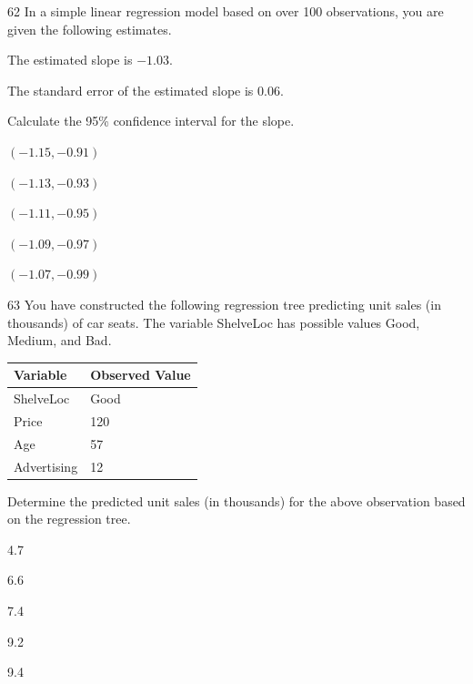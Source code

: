 \begin{question}{62}
In a simple linear regression model based on over 100 observations, you are given the following estimates.
\begin{given}
\item The estimated slope is $-1.03$.
\item The standard error of the estimated slope is 0.06.
\end{given}

Calculate the 95\% confidence interval for the slope.

\begin{choices}
\item $(-1.15, -0.91)$
\item $(-1.13, -0.93)$
\item $(-1.11, -0.95)$
\item $(-1.09, -0.97)$
\item $(-1.07, -0.99)$
\end{choices}
\end{question}

\begin{question}{63}
You have constructed the following regression tree predicting unit sales (in thousands) of car seats. The variable ShelveLoc has possible values Good, Medium, and Bad.


\begin{center}
\begin{tabular}{|l|l|}
\hline
\textbf{Variable} & \textbf{Observed Value} \\ \hline
ShelveLoc & Good \\ \hline
Price & 120 \\ \hline
Age & 57 \\ \hline
Advertising & 12 \\ \hline
\end{tabular}
\end{center}

Determine the predicted unit sales (in thousands) for the above observation based on the regression tree.

\begin{choices}
\item 4.7
\item 6.6
\item 7.4
\item 9.2
\item 9.4
\end{choices}
\end{question}

